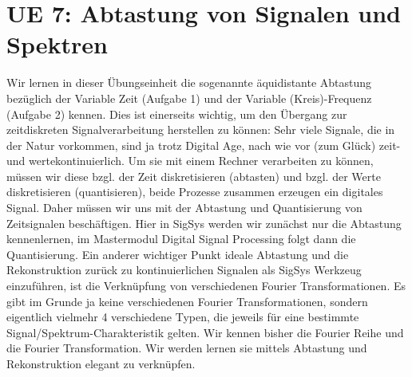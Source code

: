\clearpage
\section{UE 7: Abtastung von Signalen und Spektren}

Wir lernen in dieser Übungseinheit die sogenannte äquidistante Abtastung bezüglich
der Variable Zeit (Aufgabe 1) und der Variable (Kreis)-Frequenz (Aufgabe 2) kennen.
%
Dies ist einerseits wichtig, um den Übergang zur zeitdiskreten Signalverarbeitung
herstellen zu können: Sehr viele Signale, die in der Natur vorkommen, sind
ja trotz Digital Age, nach wie vor (zum Glück)
zeit- und wertekontinuierlich. Um sie mit einem
Rechner verarbeiten zu können, müssen wir diese bzgl. der Zeit diskretisieren
(abtasten) und bzgl. der Werte diskretisieren (quantisieren), beide Prozesse
zusammen erzeugen ein digitales Signal.
Daher müssen wir uns mit der Abtastung und Quantisierung von Zeitsignalen
beschäftigen.
Hier in SigSys werden wir zunächst nur die Abtastung kennenlernen, im Mastermodul
Digital Signal Processing folgt dann die Quantisierung.
%
Ein anderer wichtiger Punkt ideale Abtastung und die Rekonstruktion zurück
zu kontinuierlichen Signalen als SigSys Werkzeug einzuführen, ist
die Verknüpfung von verschiedenen Fourier Transformationen. Es gibt im Grunde
ja keine verschiedenen Fourier Transformationen, sondern eigentlich vielmehr
4 verschiedene Typen, die jeweils für eine bestimmte Signal/Spektrum-Charakteristik
gelten. Wir kennen bisher die Fourier Reihe und die Fourier Transformation.
Wir werden lernen sie mittels Abtastung und Rekonstruktion elegant zu verknüpfen.

